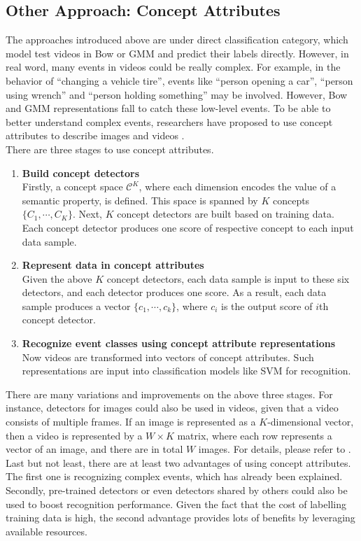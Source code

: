 \subsection{Other Approach: Concept Attributes}
The approaches introduced above are under direct classification category, which model test videos in Bow or GMM and predict their labels directly. However, in real word, many events in videos could be really complex. For example, in the behavior of ``changing a vehicle tire'', events like ``person opening a car'', ``person using wrench'' and ``person holding something'' may be involved. However, Bow and GMM representations fall to catch these low-level events. To be able to better understand complex events, researchers have proposed to use concept attributes to describe images and videos \cite{liu2013video,natsev2010ibm, natarajan2011bbn}. \\

\noindent There are three stages to use concept attributes.
\begin{enumerate}
	\item{\bf Build concept detectors}\\
	Firstly, a concept space $\mathcal{C}^K$, where each dimension encodes the value of a semantic property, is defined. This space is spanned by $K$ concepts $\{C_1, \cdots, C_K\}$. Next, $K$ concept detectors are built based on training data. Each concept detector produces one score of respective concept to each input data sample. 
	\item{\bf Represent data in concept attributes}\\
	Given the above $K$ concept detectors, each data sample is input to these six detectors, and each detector produces one score. As a result, each data sample produces a vector $\{c_1,\cdots, c_k\}$, where $c_i$ is the output score of $i$th concept detector. 
	\item{\bf Recognize event classes using concept attribute representations}\\
	Now videos are transformed into vectors of concept attributes. Such representations are input into classification models like SVM for recognition.
\end{enumerate}

\noindent There are many variations and improvements on the above three stages. For instance, detectors for images could also be used in videos, given that a video consists of multiple frames. If an image is represented as a $K$-dimensional vector, then a video is represented by a $W \times K$ matrix, where each row represents a vector of an image, and there are in total $W$ images. For details, please refer to \cite{liu2013video}. \\

\noindent Last but not least, there are at least two advantages of using concept attributes. The first one is recognizing complex events, which has already been explained. Secondly, pre-trained detectors or even detectors shared by others could also be used to boost recognition performance. Given the fact that the cost of labelling training data is high, the second advantage provides lots of benefits by leveraging available resources. 
